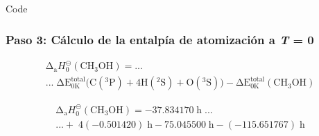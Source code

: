 \documentclass{beamer}
\begin{document}
\begin{frame}[fragile]{Code}
\frametitle{Paso 3: Cálculo de la entalpía de atomización a \textit{T} = 0}

\begin{multline}
	\mathrm{\Delta}_\mathrm{{a}} H^{\circleddash}_{\mathrm{0}}\mathrm{(CH_3OH)}  = ... \\ ...\; \mathrm{\Delta} \mathrm{E^{total}_{0K}} \mathrm{(C(^{3}P)} + \mathrm{4H(^{2}S)} + \mathrm{O(^{3}S))}- \mathrm{\Delta E^{total}_{0K} (CH_{3}OH)}
\label{eq:4.1}
\end{multline}

\begin{multline}
	\mathrm{\Delta}_\mathrm{{a}} H^{\circleddash}_{0}\mathrm{(CH_3OH)} = \mathrm{-37.834170\;h} \;... \\ ...+\;\mathrm{4(-0.501420)}\;\mathrm{h - 75.045500}\;\mathrm{h -(-115.651767)\;h}
\label{eq:4.2}
\end{multline}
\end{frame}
\end{document}
